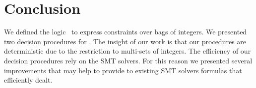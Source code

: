 
\section{Conclusion}

We defined the logic \QFBILIA\ to express constraints over bags of integers. 
We presented two decision procedures for \QFBILIA. 
The insight of our work is that our procedures are deterministic due to the restriction to multi-sets of integers.
The efficiency of our decision procedures rely on the SMT solvers. %
For this reason we presented several improvements that may help to provide to existing SMT solvers formulas that efficiently dealt.
